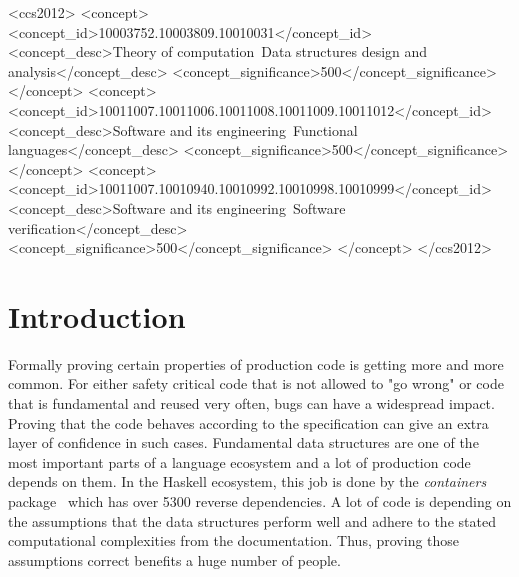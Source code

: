 \documentclass[sigplan,screen]{acmart}
\begin{document}
\begin{CCSXML}
<ccs2012>
   <concept>
       <concept_id>10003752.10003809.10010031</concept_id>
       <concept_desc>Theory of computation~Data structures design and analysis</concept_desc>
       <concept_significance>500</concept_significance>
       </concept>
   <concept>
       <concept_id>10011007.10011006.10011008.10011009.10011012</concept_id>
       <concept_desc>Software and its engineering~Functional languages</concept_desc>
       <concept_significance>500</concept_significance>
       </concept>
   <concept>
       <concept_id>10011007.10010940.10010992.10010998.10010999</concept_id>
       <concept_desc>Software and its engineering~Software verification</concept_desc>
       <concept_significance>500</concept_significance>
       </concept>
 </ccs2012>
\end{CCSXML}



\maketitle

\section{Introduction}

Formally proving certain properties of production code is getting more and more common. For either safety critical code that is not allowed to "go wrong" or code that is fundamental and reused very often, bugs can have a widespread impact. Proving that the code behaves according to the specification can give an extra layer of confidence in such cases. Fundamental data structures are one of the most important parts of a language ecosystem and a lot of production code depends on them. In the Haskell ecosystem, this job is done by the \textit{containers} package~\cite{containers} which has over 5300 reverse dependencies. A lot of code is depending on the assumptions that the data structures perform well and adhere to the stated computational complexities from the documentation. Thus, proving those assumptions correct benefits a huge number of people.
\end{document}
